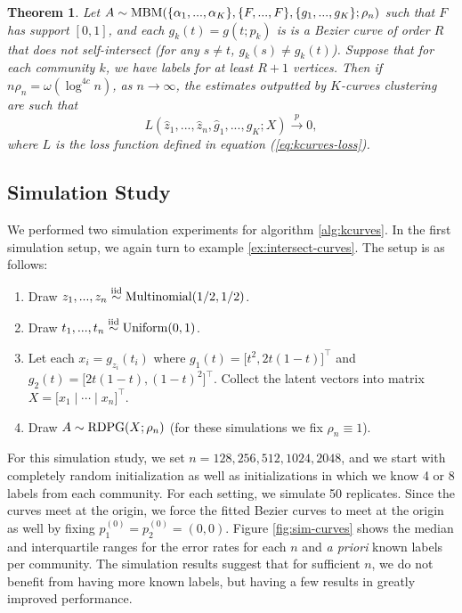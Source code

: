 \documentclass[
  12pt,
]{article}
\providecommand{\tightlist}{%
  \setlength{\itemsep}{0pt}\setlength{\parskip}{0pt}}
\newtheorem{theorem}{Theorem}[section]
\theoremstyle{definition}
\theoremstyle{definition}
\theoremstyle{definition}
\theoremstyle{definition}
\theoremstyle{remark}
\begin{document}
\begin{theorem}
\label{thm:kcurves-semisupervised}
Let $A \sim \mathrm{MBM}(\{\alpha_1, ..., \alpha_K\}, \{F, ..., F\}, \{g_1, ..., g_K\}; \rho_n)$ such that $F$ has support $[0, 1]$, and each $g_k(t) = g(t; p_k)$ is is a Bezier curve of order $R$ that does not self-intersect (for any $s \neq t$, $g_k(s) \neq g_k(t)$). 
Suppose that for each community $k$, we have labels for at least $R + 1$ vertices. 
Then if $n \rho_n = \omega(\log^{4c} n)$, as $n \to \infty$, the estimates outputted by $K$-curves clustering are such that 
$$L(\hat{z}_1, ..., \hat{z}_n, \hat{g}_1, ..., \hat{g}_K; X) \stackrel{p}{\to} 0,$$
where $L$ is the loss function defined in equation (\ref{eq:kcurves-loss}). 
\end{theorem}

\hypertarget{simulation-study-1}{%
\subsection{Simulation Study}\label{simulation-study-1}}

We performed two simulation experiments for algorithm \ref{alg:kcurves}.
In the first simulation setup, we again turn to example \ref{ex:intersect-curves}.
The setup is as follows:

\begin{enumerate}
\def\labelenumi{\arabic{enumi}.}
\tightlist
\item
  Draw \(z_1, ..., z_n \stackrel{\mathrm{iid}}{\sim} \mathrm{Multinomial}(1/2, 1/2)\).
\item
  Draw \(t_1, ..., t_n \stackrel{\mathrm{iid}}{\sim} \mathrm{Uniform}(0, 1)\).
\item
  Let each \(x_i = g_{z_i}(t_i)\) where \(g_1(t) = \Big[ t^2, 2 t (1-t) \Big]^\top\) and \(g_2(t) = \Big[ 2 t (1-t), (1-t)^2 \Big]^\top\).
  Collect the latent vectors into matrix \(X = \Big[ x_1 \mid \cdots \mid x_n \Big]^\top\).
\item
  Draw \(A \sim \mathrm{RDPG}(X; \rho_n)\) (for these simulations we fix \(\rho_n \equiv 1\)).
\end{enumerate}

For this simulation study, we set \(n = 128, 256, 512, 1024, 2048\), and we start with completely random initialization as well as initializations in which we know 4 or 8 labels from each community.
For each setting, we simulate 50 replicates.
Since the curves meet at the origin, we force the fitted Bezier curves to meet at the origin as well by fixing \(p_1^{(0)} = p_2^{(0)} = (0, 0)\).
Figure \ref{fig:sim-curves} shows the median and interquartile ranges for the error rates for each \(n\) and \emph{a priori} known labels per community.
The simulation results suggest that for sufficient \(n\), we do not benefit from having more known labels, but having a few results in greatly improved performance.
\end{document}
